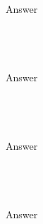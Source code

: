 \documentclass[a4paper]{article}
\begin{document}
\subsection{~} %

Answer

\subsection{~} %

Answer

\subsection{~} %

Answer

\subsection{~} %

Answer

\end{document}
